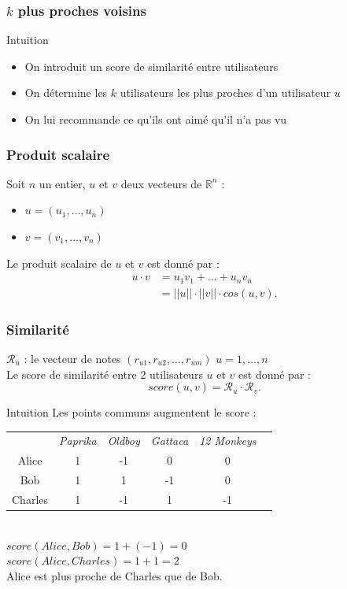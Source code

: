 \documentclass[handout]{beamer}
\begin{document}
\begin{frame}
	\frametitle{$k$ plus proches voisins}
	\begin{exampleblock}{Intuition}
		\begin{itemize}
		\item On introduit un score de similarité entre utilisateurs
		\item On détermine les $k$ utilisateurs les plus proches d'un utilisateur $u$
		\item On lui recommande ce qu'ils ont aimé qu'il n'a pas vu
		\end{itemize}
	\end{exampleblock}
\end{frame}

\def\R{\mathcal{R}}
\def\N{N}

\begin{frame}
	\frametitle{Produit scalaire}
	Soit $n$ un entier, $u$ et $v$ deux vecteurs de $\mathbb{R}^n$ :
	\begin{itemize}
	\item $u = (u_1, \ldots, u_n)$
	\item $v = (v_1, \ldots, v_n)$
	\end{itemize}\bigskip
	
	Le produit scalaire de $u$ et $v$ est donné par :
	\begin{align*}
	u \cdot v & = u_1 v_1 + \ldots + u_n v_n\\
	& = ||u|| \cdot ||v|| \cdot cos(u, v).
	\end{align*}
\end{frame}

\begin{frame}
	\frametitle{Similarité}
	$\R_u$ : le vecteur de notes $(r_{u1}, r_{u2}, \ldots, r_{um})$ \qquad $u = 1, \ldots, n$\\
	Le \alert{score de similarité} entre 2 utilisateurs $u$ et $v$ est donné par :
	\[ score(u, v) = \R_u \cdot \R_v. \]
	\begin{exampleblock}{Intuition}
	Les points communs augmentent le score :
	\begin{center}
	\begin{tabular}{cccccc}
	& \emph{Paprika} & \emph{Oldboy} & \emph{Gattaca} & \emph{12 Monkeys}\\
	Alice & 1 & -1 & 0 & 0\\
	Bob & 1 & 1 & -1 & 0\\
	Charles & 1 & -1 & 1 & -1
	\end{tabular}\\
	\vspace{5mm}
	$score(Alice, Bob) = 1 + (-1) = 0$\\
	$score(Alice, Charles) = 1 + 1 = 2$\\
	Alice est \alert{plus proche} de Charles que de Bob.
	\end{center}
	\end{exampleblock}
\end{frame}
\end{document}
